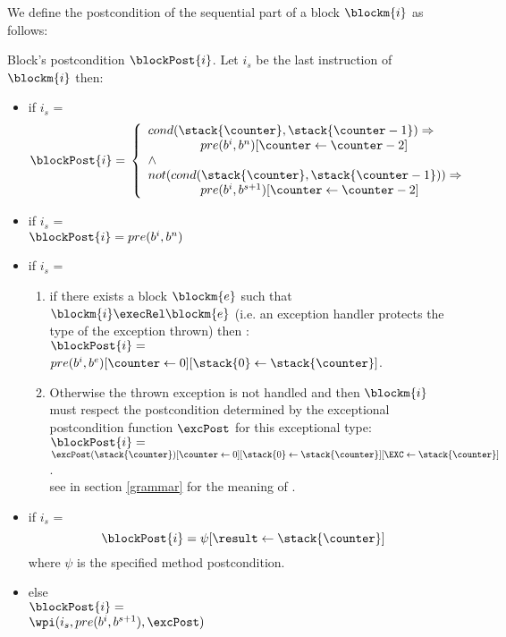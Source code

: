 We define the postcondition of the sequential part of a block $\blockm{i}$ as follows:
\begin{blockkkPost}
{Block's postcondition $\blockPost{i}$.}\label{post}
Let $i_s$ be the last instruction of $\blockm{i}$ then:
\begin{itemize} 
\item if  $i_s$ =   
$$
\blockPost{i} =  \\
\left\{
\begin{array}{l}
cond( \stack{\counter}, \stack{\counter - 1} )   \Rightarrow \\
\phantom{ \counter }   pre(b^{i}, b^{n})[ \counter \leftarrow \counter -2 ]  \\
\wedge \\
 not ( cond( \stack{\counter}, \stack{\counter - 1} )  )   \Rightarrow \\
\phantom{ \counter}    pre(b^{i}, b^{s+1})[ \counter \leftarrow \counter -2 ]      \\                             
\end{array}
\right.
$$
\item if  $i_s$ =   \\ 
$\blockPost{i} =  pre(b^{i}, b^{n})$ 
\item  if  $i_s$ =  
\begin{enumerate}
\item if there exists a block $\blockm{e}$ such that 
$\blockm{i} \execRel \blockm{e}$ (i.e. an exception handler protects the type of the exception thrown)
then :\\
$\blockPost{i }=$\\
$ pre(b^{i}, b^{e})[\counter \leftarrow 0][\stack{0} \leftarrow \stack{\counter}] $.
\item Otherwise the thrown exception is not handled and then $\blockm{i}$ must respect the postcondition determined by
the exceptional postcondition function $\excPost$ for this exceptional type:\\ %
 $\blockPost{i }=$\\ $\excPost(\stack{\counter}) [\counter \leftarrow 0][\stack{0} \leftarrow \stack{\counter} ] [\EXC \leftarrow \stack{\counter}] $. \\
see in section \ref{grammar} for the meaning of \EXC.
    \end{enumerate}
\item  if  $i_s$ = 
$$
   \blockPost{i } = \psi[\result \leftarrow \stack{\counter} ]    
$$
where $\psi $ is the specified method postcondition.
\item  else  \\[3 mm]
 $ \blockPost{i} =$  \\ $\wpi(  i_s , pre(b^{i}, b^{s+1}) , \excPost)  $
 \end{itemize}

\end{blockkkPost}
